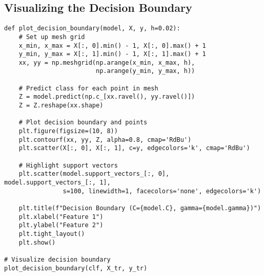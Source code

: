 \documentclass[11pt]{article}
\begin{document}
\subsection{Visualizing the Decision Boundary}
\begin{lstlisting}
def plot_decision_boundary(model, X, y, h=0.02):
    # Set up mesh grid
    x_min, x_max = X[:, 0].min() - 1, X[:, 0].max() + 1
    y_min, y_max = X[:, 1].min() - 1, X[:, 1].max() + 1
    xx, yy = np.meshgrid(np.arange(x_min, x_max, h),
                         np.arange(y_min, y_max, h))
    
    # Predict class for each point in mesh
    Z = model.predict(np.c_[xx.ravel(), yy.ravel()])
    Z = Z.reshape(xx.shape)
    
    # Plot decision boundary and points
    plt.figure(figsize=(10, 8))
    plt.contourf(xx, yy, Z, alpha=0.8, cmap='RdBu')
    plt.scatter(X[:, 0], X[:, 1], c=y, edgecolors='k', cmap='RdBu')
    
    # Highlight support vectors
    plt.scatter(model.support_vectors_[:, 0], model.support_vectors_[:, 1],
                s=100, linewidth=1, facecolors='none', edgecolors='k')
    
    plt.title(f"Decision Boundary (C={model.C}, gamma={model.gamma})")
    plt.xlabel("Feature 1")
    plt.ylabel("Feature 2")
    plt.tight_layout()
    plt.show()

# Visualize decision boundary
plot_decision_boundary(clf, X_tr, y_tr)
\end{lstlisting}
\end{document}
